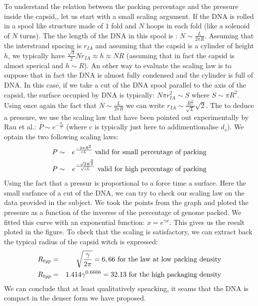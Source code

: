 \documentclass{article}
\begin{document}
To understand the relation between the packing percentage and the pressure inside the capsid,, let us start with a small scaling argument. If the DNA is rolled in a spool like structure made of $1$ fold and $N$ hoops in each fold (like a solenoid of $N$ turns). The the length of the DNA in this spool is : $N \sim \frac{L}{2 \pi R}$. Assuming that the interstrand spacing is $r_{IA}$ and assuming that the capsid is a cylinder of height $h$, we typically have $\frac{\sqrt{3}}{2} N r_{IA} \approx h \approx NR$ (assuming that in fact the capsid is almost sperical and $h \sim R$).
An other way to evaluate the scaling law is to suppose that in fact the DNA is almost fully condensed and the cylinder is full of DNA. In this case, if we take a cut of the DNA spool parallel to the axis of the capsid, the surface occupied by DNA is typically: $N \pi r^2_{IA} \sim S$ where $S \sim \pi R^2$. Using once again the fact that $N \sim \frac{L}{2 \pi R}$ we can write $r_{IA} \sim \frac{R^{\frac{3}{2}}}{\sqrt{L}}\sqrt{2}$.
The to deduce a pressure, we use the scaling law that have been pointed out experimentally by Rau et al.: $P \sim e^{-\frac{d_s}{c}}$ (where c is typically just here to addimentionalise $d_s$). We optain the two following scaling laws:
\begin{eqnarray}
    P &\sim& e^{\frac{- 2 \pi R^2}{cL}} \textnormal{ valid for small percentage of packing}\\
    P & \sim & e^{\frac{- \sqrt{2} R^{\frac{3}{2}}}{\sqrt{cL}}} \textnormal{ valid for high percentage of packing} 
\end{eqnarray}
Using the fact that a pressur is proportional to a force time a surface. Here the small surfance of a cut of the DNA, we can try to check our scaling law on the data provided in the subject. We took the points from the graph and ploted the pressure as a function of the inverrse of the percentage of genome packed. We fitted this curve with an exponential function: $x = e^{\gamma x}$. This gives us the result ploted in the figure. To check that the scaling is satisfactory, we can extract back the typical radius of the capsid witch is expressed:
\begin{eqnarray}
    R_{typ} & = &  \sqrt{\frac{\gamma}{2 \pi}} = 6,66 \textnormal{ for the law at low packing density}\\
    R_{typ} & = & 1.414 \gamma^{0.6666} = 32.13 \textnormal{ for the high packaging density}
\end{eqnarray}
We can conclude that at least qualitatively speacking, it seams that the DNA is compact in the denser form we have proposed.
\end{document}
